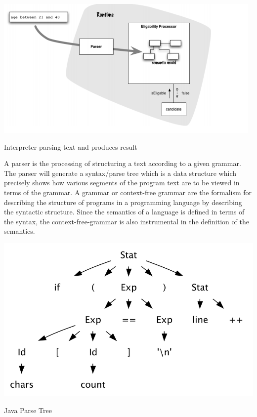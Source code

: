 \documentclass[chapterprefix=false]{scrreprt}
\begin{document}
\begin{center}
 \includegraphics[scale=0.7]{interpreter}
 \newline
 \caption{Interpreter parsing text and produces result \cite{DBLP:books/daglib/0034522}}
\end{center}

A parser is the processing of structuring a text according to a given grammar. The parser will generate a syntax/parse tree which is a data structure which precisely shows how various segments of the program text are to be viewed in terms of the grammar. A grammar or context-free grammar are the formalism for describing the structure of programs in a programming language by describing the syntactic structure. Since the semantics of a language is defined in terms of the syntax, the context-free-grammar is also instrumental in the definition of the semantics\cite{grune2012modern}.

\begin{center}
 \includegraphics[scale=0.4]{parse-tree-java}
 \newline
 \caption{Java Parse Tree \cite{java-parse-tree}}
\end{center}
\end{document}
